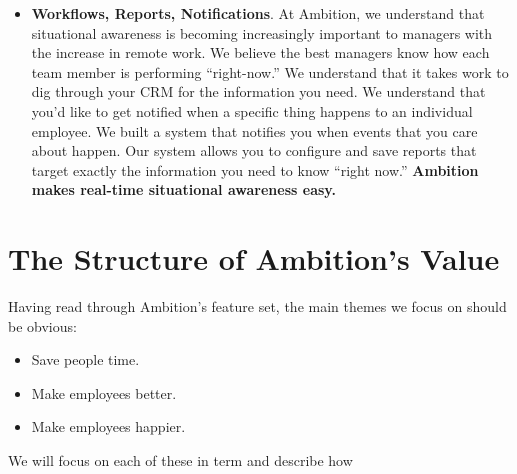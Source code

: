 \documentclass[paper=a4, fontsize=11pt abstract]{scrartcl}
\numberwithin{equation}{section}		%
\numberwithin{figure}{section}			%
\numberwithin{table}{section}				%
\begin{document}
\begin{itemize}
   \item \textbf{Workflows, Reports, Notifications}.
   At Ambition, we understand that situational awareness is becoming increasingly important to managers with the increase in remote work.
   We believe the best managers know how each team member is performing ``right-now.''
   We understand that it takes work to dig through your CRM for the information you need.
   We understand that you'd like to get notified when a specific thing happens to an individual employee.
   We built a system that notifies you when events that you care about happen.
   Our system allows you to configure and save reports that target exactly the information you need to know ``right now.''
   \textbf{Ambition makes real-time situational awareness easy.} 
    
\end{itemize}

\section{The Structure of Ambition's Value}
Having read through Ambition's feature set, the main themes we focus on should be obvious:
\begin{itemize}
    \item Save people time.
    \item Make employees better.
    \item Make employees happier.
\end{itemize}

We will focus on each of these in term and describe how
\end{document}
